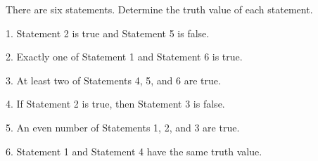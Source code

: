There are six statements. Determine the truth value of each statement. 



1. Statement 2 is true and Statement 5 is false.

2. Exactly one of Statement 1 and Statement 6 is true.

3. At least two of Statements 4, 5, and 6 are true.

4. If Statement 2 is true, then Statement 3 is false.

5. An even number of Statements 1, 2, and 3 are true.

6. Statement 1 and Statement 4 have the same truth value.





